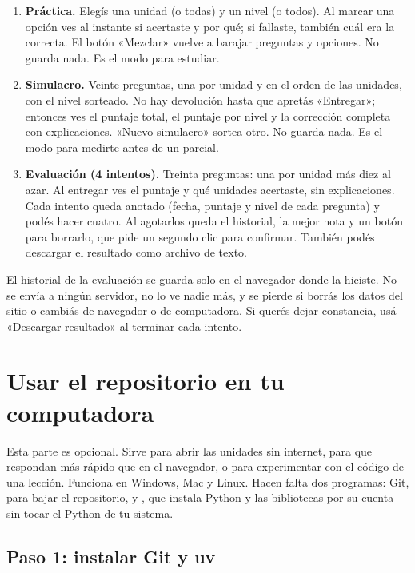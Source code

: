 \documentclass[11pt,a4paper]{report}
\newcommand{\clave}[1]{\texttt{\detokenize{#1}}}
\begin{document}
\begin{enumerate}
  \item \textbf{Práctica.} Elegís una unidad (o todas) y un nivel (o todos). Al marcar una opción ves al instante si acertaste y por qué; si fallaste, también cuál era la correcta. El botón «Mezclar» vuelve a barajar preguntas y opciones. No guarda nada. Es el modo para estudiar.
  \item \textbf{Simulacro.} Veinte preguntas, una por unidad y en el orden de las unidades, con el nivel sorteado. No hay devolución hasta que apretás «Entregar»; entonces ves el puntaje total, el puntaje por nivel y la corrección completa con explicaciones. «Nuevo simulacro» sortea otro. No guarda nada. Es el modo para medirte antes de un parcial.
  \item \textbf{Evaluación (4 intentos).} Treinta preguntas: una por unidad más diez al azar. Al entregar ves el puntaje y qué unidades acertaste, sin explicaciones. Cada intento queda anotado (fecha, puntaje y nivel de cada pregunta) y podés hacer cuatro. Al agotarlos queda el historial, la mejor nota y un botón para borrarlo, que pide un segundo clic para confirmar. También podés descargar el resultado como archivo de texto.
\end{enumerate}

\begin{atencion}
El historial de la evaluación se guarda solo en el navegador donde la hiciste. No se envía a ningún servidor, no lo ve nadie más, y se pierde si borrás los datos del sitio o cambiás de navegador o de computadora. Si querés dejar constancia, usá «Descargar resultado» al terminar cada intento.
\end{atencion}

\section{Usar el repositorio en tu computadora}\label{sec:local}

Esta parte es opcional. Sirve para abrir las unidades sin internet, para que respondan más rápido que en el navegador, o para experimentar con el código de una lección. Funciona en Windows, Mac y Linux. Hacen falta dos programas: Git, para bajar el repositorio, y \clave{uv}, que instala Python y las bibliotecas por su cuenta sin tocar el Python de tu sistema.

\subsection{Paso 1: instalar Git y uv}
\end{document}
